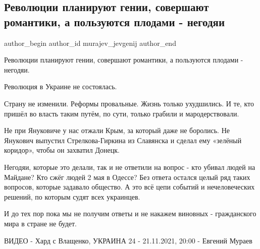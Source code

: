  
 
 
 
 
 
\subsection{Революции планируют гении, совершают романтики, а пользуются плодами - негодяи}
\label{sec:21_11_2021.fb.murajev_jevgenij.1.revolucia}
 
\ifcmt
 author_begin
   author_id murajev_jevgenij
 author_end
\fi

Революции планируют гении, совершают романтики, а пользуются плодами - негодяи. 

Революция в Украине не состоялась. 

Страну не изменили. Реформы провальные. Жизнь только ухудшились. И те, кто
пришёл во власть таким путём, по сути, только грабили и мародерствовали. 

Не при Януковиче у нас отжали Крым, за который даже не боролись. Не Янукович
выпустил Стрелкова-Гиркина из Славянска и сделал ему «зелёный коридор», чтобы
он захватил Донецк. 

Негодяи, которые это делали, так и не ответили на вопрос - кто убивал людей на
Майдане? Кто сжёг людей 2 мая в Одессе? Без ответа остался целый ряд таких
вопросов, которые задавало общество. А это всё цепи событий и нечеловеческих
решений, по которым судят всех украинцев. 

И до тех пор пока мы не получим ответы и не накажем виновных - гражданского
мира в стране не будет.

\zzrule

ВИДЕО - Хард с Влащенко, УКРАИНА 24 - 21.11.2021, 20:00 - Евгений Мураев

